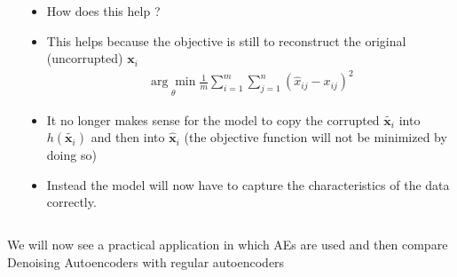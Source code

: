 \begin{frame}

                \begin{columns}
        \begin{overlayarea}{\textwidth}{\textheight}
        \vspace{10pt}
        
        \vspace{-0.2in}
        \end{overlayarea}
        \begin{overlayarea}{\textwidth}{\textheight}
        \begin{itemize}\justifying
            \item<1-> How does this help ?
            \item<2-> This helps because the objective is still to reconstruct the original (uncorrupted) $\textbf{x}_{i}$ 
            \vspace{-0.1in}
            \begin{align*}
                \underset{\theta}{\arg \min} \frac{1}{m}\sum\limits_{i=1}^m\sum\limits_{j=1}^n(\hat{x}_{ij}-x_{ij})^2
            \end{align*}
            
            \vspace{-0.1in}
            \item<3-> It no longer makes sense for the model to copy the corrupted $\widetilde{\textbf{x}_i}$ into $h(\widetilde{\textbf{x}_i})$ and then into $\hat{\textbf{x}}_{i}$ (the objective function will not be minimized by doing so)
            \item<4-> Instead the model will now have to capture the characteristics of the data correctly.
        \end{itemize}
        \end{overlayarea}
        \end{columns}
\end{frame}

\begin{frame}
    \begin{block}{}
     We will now see a practical application in which AEs are used and then compare Denoising Autoencoders with regular autoencoders
    \end{block}
\end{frame}

